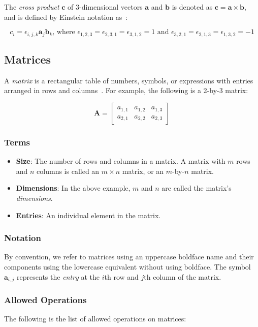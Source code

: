 \documentclass[12pt]{article}
\begin{document}
The \textit{cross product} $\mathbf{c}$ of 3-dimensional vectors $\mathbf{a}$ and
$\mathbf{b}$ is denoted as $\mathbf{c} = \mathbf{a} \times 
\mathbf{b}$, and is defined by Einstein notation as~\citep{ContinuumMechanics2012}:

$$c_i = \epsilon_{i,j,k}\mathbf{a}_j\mathbf{b}_k\text{, where }\epsilon_{1,2,3}=
\epsilon_{2,3,1}=\epsilon_{3,1,2} = 1\text{ and }\epsilon_{3,2,1} = \epsilon_{2,1,3}
= \epsilon_{1,3,2} = -1$$


\subsection{Matrices}
A \textit{matrix} is a rectangular table of numbers, symbols, or expressions
with entries arranged in rows and columns~\citep{Wikipedia_Matrix_2025}. For
example, the following is a 2-by-3 matrix: 

$$\mathbf{A} = 
\begin{bmatrix}
  a_{1,1} & a_{1,2} & a_{1,3} \\
  a_{2,1} & a_{2,2} & a_{2,3}
 \end{bmatrix}$$

\subsubsection{Terms}

\begin{itemize}
\item \textbf{Size}: The number of rows and columns in a matrix. A matrix with
      $m$ rows and $n$ columns is called an $m \times n$ matrix, or an $m$-by-$n$ matrix.
\item \textbf{Dimensions}: In the above example, $m$ and $n$ are called the matrix's
      \textit{dimensions}.
\item \textbf{Entries}: An individual element in the matrix.
\end{itemize}

\subsubsection{Notation}

By convention, we refer to matrices using an uppercase boldface name and
their components using the lowercase equivalent without using boldface. The
symbol $\mathbf{a}_{i,j}$ represents the \textit{entry} at the $i$th row
and $j$th column of the matrix.

\subsubsection{Allowed Operations}
The following is the list of allowed operations on matrices:
\end{document}
